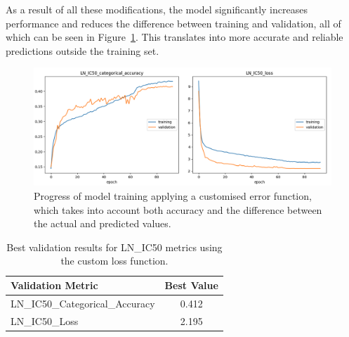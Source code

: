 As a result of all these modifications, the model significantly increases performance and reduces the difference between training and validation, all of which can be seen in Figure~\ref{fig:train_class_net_v4}. This translates into more accurate and reliable predictions outside the training set.

\begin{figure}[H]
    \centering
    \includegraphics[width=1\textwidth]{figures/neural_net_classification/classification_custom_loss.png}
    \caption{Progress of model training applying a customised error function, which takes into account both accuracy and the difference between the actual and predicted values.}
    \label{fig:train_class_net_v4}
\end{figure}

\begin{table}[H]
    \centering
    \begin{tabular}{|l|c|}
    \hline
    \textbf{Validation Metric} & \textbf{Best Value} \\
    \hline
    LN\_IC50\_Categorical\_Accuracy & 0.412 \\
    LN\_IC50\_Loss & 2.195 \\
    \hline
    \end{tabular}
    \caption{Best validation results for LN\_IC50 metrics using the custom loss function.}
    \label{tab:best_val_ln_ic50_customloss}
\end{table}

